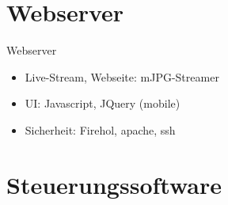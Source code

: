 \documentclass{beamer}
\begin{document}
\section{Webserver} %
\begin{frame}{Webserver}
\begin{itemize}
	\item<1-2,4-> Live-Stream, Webseite: mJPG-Streamer
	\item<2,4-> UI: Javascript, JQuery (mobile)
	\item<4-> Sicherheit: Firehol, apache, ssh
\end{itemize}
\end{frame}


\section{Steuerungssoftware}%
\end{document}
